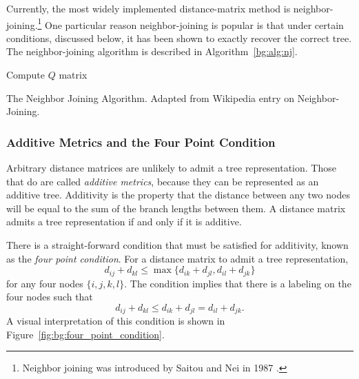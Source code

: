 Currently, the most widely implemented distance-matrix method is neighbor-joining.\footnote{Neighbor joining was introduced by Saitou and Nei in 1987 \cite{Saitou:1987wo}.}
One particular reason neighbor-joining is popular is that under certain conditions, discussed below, it has been shown to exactly recover the correct tree.
The neighbor-joining algorithm is described in Algorithm~\ref{bg:alg:nj}.

\begin{algorithm}
     {
        Compute $Q$ matrix\;
    }
    \caption{The Neighbor Joining Algorithm. Adapted from Wikipedia entry on Neighbor-Joining.}
    \label{bg:alg:nj}
\end{algorithm}

\subsubsection{Additive Metrics and the Four Point Condition}
\label{bg:bio:phylo:additivity}

Arbitrary distance matrices are unlikely to admit a tree representation.
Those that do are called \emph{additive metrics}, because they can be represented as an additive tree.
Additivity is the property that the distance between any two nodes will be equal to the sum of the branch lengths between them.
A distance matrix admits a tree representation if and only if it is additive.

There is a straight-forward condition that must be satisfied for additivity, known as the \emph{four point condition}.
For a distance matrix to admit a tree representation, 
\begin{equation}
d_{ij} + d_{kl} \leq \max\{d_{ik} + d_{jl} ,  d_{il} + d_{jk} \}
\end{equation}
for any four nodes $\{i,j,k,l\}$.
The condition implies that there is a labeling on the four nodes such that
\begin{equation}
d_{ij} + d_{kl} \leq d_{ik} + d_{jl} =  d_{il} + d_{jk}.
\end{equation}
A visual interpretation of this condition is shown in Figure~\ref{fig:bg:four_point_condition}.

